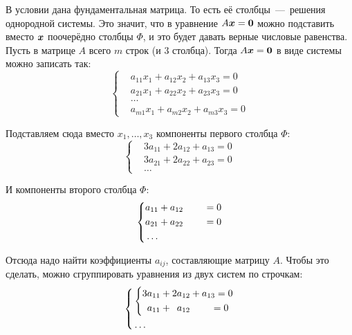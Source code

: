 \documentclass[a4paper,12pt]{article}
\begin{document}
\begin{solution}
    В условии дана фундаментальная матрица.
    То есть её столбцы~---~решения однородной системы.
    Это значит, что в уравнение $A \bds x \hm= \bds 0$ можно подставить вместо $\boldsymbol x$ поочерёдно столбцы $\Phi$, и это будет давать верные числовые равенства.
    Пусть в матрице $A$ всего $m$ строк (и $3$ столбца).
    Тогда $A \bds x \hm= \bds 0$ в виде системы можно записать так:
    \[
      \left\{
        \begin{aligned}
          &a_{11} x_1 + a_{12} x_2 + a_{13} x_3 = 0\\
          &a_{21} x_1 + a_{22} x_2 + a_{23} x_3 = 0\\
          &\ldots\\
          &a_{m1} x_1 + a_{m2} x_2 + a_{m3} x_3 = 0
        \end{aligned}
      \right.
    \]
    
    Подставляем сюда вместо $x_1, \ldots, x_3$ компоненты первого столбца $\Phi$:
    \[
      \left\{
        \begin{aligned}
          &3 a_{11} + 2 a_{12} + a_{13} = 0\\
          &3 a_{21} + 2 a_{22} + a_{23} = 0\\
          &\ldots
        \end{aligned}
      \right.
    \]
    
    И компоненты второго столбца $\Phi$:
    \[
      \left\{
        \begin{aligned}
          &a_{11} + a_{12} \hphantom{+ a_{13}} = 0\\
          &a_{21} + a_{22} \hphantom{+ a_{23}} = 0\\
          &\ldots
        \end{aligned}
      \right.
    \]
    
    Отсюда надо найти коэффициенты $a_{ij}$, составляющие матрицу $A$.
    Чтобы это сделать, можно сгруппировать уравнения из двух систем по строчкам:
    \[
      \left\{
        \begin{aligned}
          &\left\{
            \begin{aligned}
              &3 a_{11} + 2 a_{12} + a_{13} = 0\\
              &\hphantom{3}a_{11} + \hphantom{2}a_{12} \hphantom{+ a_{13}} = 0
            \end{aligned}
          \right.\\
          &\ldots
        \end{aligned}
      \right.
    \]
    

\end{solution}
\end{document}

